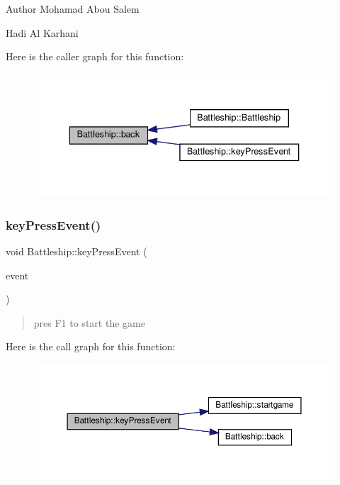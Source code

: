 \begin{DoxyAuthor}{Author}
Mohamad Abou Salem 

Hadi Al Karhani 
\end{DoxyAuthor}
Here is the caller graph for this function\+:
\nopagebreak
\begin{figure}[H]
\begin{center}
\leavevmode
\includegraphics[width=336pt]{classBattleship_a37515bbb9fe274e559315cb177fe13e5_icgraph}
\end{center}
\end{figure}
\mbox{\label{classBattleship_a708a8b74e16ed2febd644e718445457a}} 
\subsubsection{\texorpdfstring{key\+Press\+Event()}{keyPressEvent()}}
{\footnotesize\ttfamily void Battleship\+::key\+Press\+Event (\begin{DoxyParamCaption}\item[{Q\+Key\+Event $\ast$}]{event }\end{DoxyParamCaption})\hspace{0.3cm}{\ttfamily [inline]}}



\begin{quote}
pres F1 to start the game \end{quote}


Here is the call graph for this function\+:
\nopagebreak
\begin{figure}[H]
\begin{center}
\leavevmode
\includegraphics[width=350pt]{classBattleship_a708a8b74e16ed2febd644e718445457a_cgraph}
\end{center}
\end{figure}
\mbox{\label{classBattleship_abd2c4b47572e707f91e5fef6790a48a5}} 
